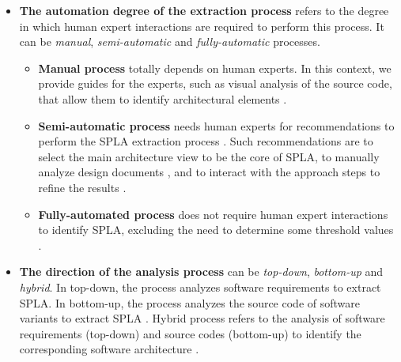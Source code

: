 \documentclass[graybox]{svmult}
\begin{document}
\begin{itemize}

	\item \textbf{The automation degree of the extraction process} refers to the degree in which human expert interactions are required to perform this process. It can be \textit{manual}, \textit{semi-automatic} and \textit{fully-automatic} processes.  
	
    \begin{itemize}
        \item \textbf{Manual process} totally depends on human experts.  In this context, we provide guides for the experts, such as visual analysis of the source code, that allow them to identify architectural elements \cite{langelier2005visualization,22_wu2011recovering}. 	

        \item \textbf{Semi-automatic process} needs human experts for recommendations to perform the SPLA extraction process \cite{kang2005feature}. Such recommendations are to select the main architecture view to be the core of SPLA, to manually analyze design documents \cite{pinzger2004architecture}, and to interact with the approach steps to refine the results \cite{erdemir2011object}. 

        \item \textbf{Fully-automated process} does not require human expert interactions to identify SPLA, excluding the need to determine some threshold values \cite{mende2008supporting,shatnawi2017recovering}. 

    \end{itemize}

	\item \textbf{The direction of the analysis process} can be \textit{top-down}, \textit{bottom-up} and \textit{hybrid}. 
	In top-down, the process analyzes software requirements to extract SPLA.  In bottom-up, the process analyzes the source code of software variants to extract SPLA \cite{kang2005feature,koschke2009extending,frenzel2007extending,shatnawi2017recovering}. 
	Hybrid process refers to the analysis of software requirements (top-down) and source codes (bottom-up) to identify the corresponding software architecture \cite{allier2009identifying}. 
	

\end{itemize}
\end{document}
